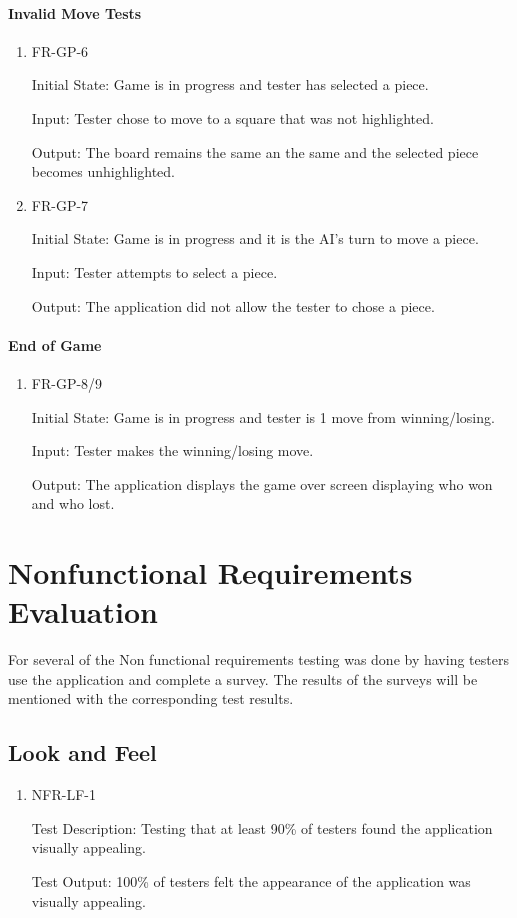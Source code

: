 \documentclass[12pt, titlepage]{article}
\begin{document}
\paragraph{Invalid Move Tests}
\begin{enumerate}
    \item{FR-GP-6}
    \label{FR-GP-6}    
                        
    Initial State: Game is in progress and tester has selected a piece.
    
    Input: Tester chose to move to a square that was not highlighted.
    
    Output: The board remains the same an the same and the selected piece becomes unhighlighted.
    \item{FR-GP-7}
    \label{FR-GP-7}    
                    
    Initial State: Game is in progress and it is the AI's turn to move a piece.
    
    Input: Tester attempts to select a piece.
    
    Output: The application did not allow the tester to chose a piece.
\end{enumerate}

\paragraph{End of Game}
\begin{enumerate}
    \item{FR-GP-8/9}
    \label{FR-GP-8/9}
                        
    Initial State: Game is in progress and tester is 1 move from winning/losing.
    
    Input: Tester makes the winning/losing move.
    
    Output: The application displays the game over screen displaying who won and who lost.
    
 \end{enumerate}

\section{Nonfunctional Requirements Evaluation}
For several of the Non functional requirements testing was done by having testers use the application and complete a survey. The results of the surveys will be mentioned with the corresponding test results.

\subsection{Look and Feel}
\begin{enumerate}
    \item {NFR-LF-1}
    \label{NFR-LF-1}    
    
    Test Description: Testing that at least 90\% of testers found the application visually appealing.
    
    Test Output: 100\% of testers felt the appearance of the application was visually appealing.
\end{enumerate}
\end{document}
